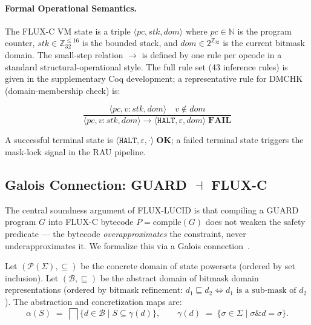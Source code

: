 \documentclass[sigplan,review,anonymous]{acmart}
\begin{document}
\paragraph{Formal Operational Semantics.}
The FLUX-C VM state is a triple
$\langle \mathit{pc}, \mathit{stk}, \mathit{dom} \rangle$
where $\mathit{pc} \in \mathbb{N}$ is the program counter,
$\mathit{stk} \in \mathbb{Z}_{32}^{\le 16}$ is the bounded stack, and
$\mathit{dom} \in 2^{\mathbb{Z}_{32}}$ is the current bitmask domain.
The small-step relation $\longrightarrow$ is defined by one rule per opcode
in a standard structural-operational style.
The full rule set (43 inference rules) is given in the supplementary Coq
development; a representative rule for DMCHK (domain-membership check) is:

\[
  \frac{
    \langle \mathit{pc}, v{:}\mathit{stk}, \mathit{dom} \rangle \quad
    v \notin \mathit{dom}
  }{
    \langle \mathit{pc}, v{:}\mathit{stk}, \mathit{dom} \rangle
    \longrightarrow
    \langle \mathtt{HALT}, \varepsilon, \mathit{dom} \rangle \; \mathbf{FAIL}
  }
\]

A successful terminal state is $\langle \mathtt{HALT}, \varepsilon, \cdot \rangle\; \mathbf{OK}$;
a failed terminal state triggers the mask-lock signal in the RAU pipeline.

\subsection{Galois Connection: GUARD $\dashv$ FLUX-C}
\label{sec:galois}

The central soundness argument of FLUX-LUCID is that compiling a GUARD
program $G$ into FLUX-C bytecode $P = \mathrm{compile}(G)$ does not
weaken the safety predicate — the bytecode \emph{overapproximates}
the constraint, never underapproximates it.
We formalize this via a Galois connection~\cite{cousot1977}.

\begin{definition}
\label{def:galois}
Let $(\mathcal{P}(\Sigma), \subseteq)$ be the concrete domain of state
powersets (ordered by set inclusion).
Let $(\mathcal{B}, \sqsubseteq)$ be the abstract domain of bitmask
domain representations (ordered by bitmask refinement: $d_1 \sqsubseteq d_2
\Leftrightarrow d_1 \text{ is a sub-mask of } d_2$).
The abstraction and concretization maps are:
\[
  \alpha(S) \;=\; \bigsqcap \{ d \in \mathcal{B} \mid S \subseteq \gamma(d) \},
  \qquad
  \gamma(d) \;=\; \{ \sigma \in \Sigma \mid \sigma \mathbin{\&} d = \sigma \}.
\]
\end{definition}
\end{document}
